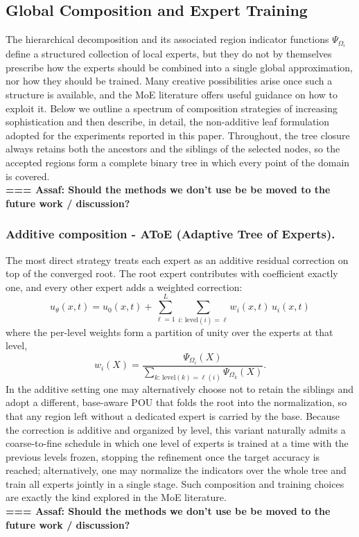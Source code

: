\vspace{0.5em}

\subsection{Global Composition and Expert Training}
\label{sec:variants}

The hierarchical decomposition and its associated region indicator functions
$\Psi_{\Omega_i}$ define a structured collection of local experts, but they do not
by themselves prescribe how the experts should be combined into a single global
approximation, nor how they should be trained. Many creative possibilities arise
once such a structure is available, and the MoE literature offers
useful guidance on how to
exploit it. Below we
outline a spectrum of composition strategies of increasing sophistication and then
describe, in detail, the non-additive leaf formulation adopted for the experiments
reported in this paper. Throughout, the tree closure always retains both the
ancestors and the siblings of the selected nodes, so the accepted regions form a
complete binary tree in which every point of the domain is covered.\\
{\bf === Assaf: Should the methods we don't use be be moved to the future work / discussion?}\\
\subsubsection{Additive composition - AToE (Adaptive Tree of Experts).}
The most direct strategy treats each expert as an additive residual correction on
top of the converged root. The root expert contributes with coefficient
exactly one, and every other expert adds a weighted correction:
\begin{equation}
u_\theta(x,t) = u_0(x,t) + \sum_{\ell=1}^{L} \sum_{i:\,\text{level}(i)=\ell}
w_i(x,t)\, u_i(x,t)
\label{eq:global_atoe}
\end{equation}
where the per-level weights form a partition of unity over the experts at that
level,
\begin{equation}
w_i(X) = \frac{\Psi_{\Omega_i}(X)}{\sum_{k:\,\text{level}(k)=\ell(i)} \Psi_{\Omega_k}(X)}.
\label{eq:normalization_atoe}
\end{equation}
In the additive setting one may alternatively choose not to retain the siblings
and adopt a different, base-aware POU that folds the root into the
normalization, so that any region left without a dedicated expert is carried by
the base.
Because the correction is additive and organized by level, this variant naturally
admits a coarse-to-fine schedule in which one level of experts is trained at a
time with the previous levels frozen, stopping the refinement once the target
accuracy is reached; alternatively, one may normalize the indicators over the
whole tree and train all experts jointly in a single stage. Such composition and
training choices are exactly the kind explored in the MoE literature.
\\
{\bf === Assaf: Should the methods we don't use be be moved to the future work / discussion?}\\
